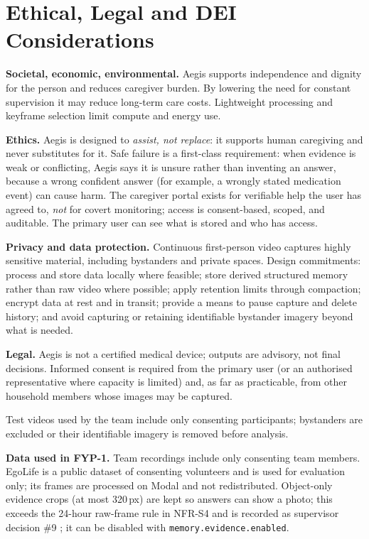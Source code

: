 \section{Ethical, Legal and DEI Considerations}
\label{sec:ethics}
\textbf{Societal, economic, environmental.} Aegis supports independence and
dignity for the person and reduces caregiver burden. By lowering the need for
constant supervision it may reduce long-term care costs. Lightweight
processing and keyframe selection limit compute and energy use.

\textbf{Ethics.} Aegis is designed to \emph{assist, not replace}: it supports
human caregiving and never substitutes for it. Safe failure is a first-class
requirement: when evidence is weak or conflicting, Aegis says it is unsure
rather than inventing an answer, because a wrong confident answer (for example,
a wrongly stated medication event) can cause harm. The caregiver portal exists
for verifiable help the user has agreed to, \emph{not} for covert monitoring;
access is consent-based, scoped, and auditable. The primary user can see what
is stored and who has access. 

\textbf{Privacy and data protection.} Continuous first-person video captures
highly sensitive material, including bystanders and private spaces. Design
commitments: process and store data locally where feasible; store derived
structured memory rather than raw video where possible; apply retention limits
through compaction; encrypt data at rest and in transit; provide a means to
pause capture and delete history; and avoid capturing or retaining identifiable
bystander imagery beyond what is needed.

\textbf{Legal.} Aegis is not a certified medical device; outputs are advisory,
not final decisions. Informed consent is required from the primary user (or an
authorised representative where capacity is limited) and, as far as
practicable, from other household members whose images may be captured.

Test videos used by the team include only consenting participants; bystanders are excluded or their identifiable imagery is removed before analysis.

\textbf{Data used in FYP-1.} Team recordings include only consenting team
members. EgoLife is a public dataset of consenting volunteers and is used for
evaluation only; its frames are processed on Modal and not redistributed.
Object-only evidence crops (at most 320\,px) are kept so answers can show a
photo; this exceeds the 24-hour raw-frame rule in NFR-S4 and is recorded as
supervisor decision \#9 ; it can be disabled
with \texttt{memory.evidence.enabled}.

